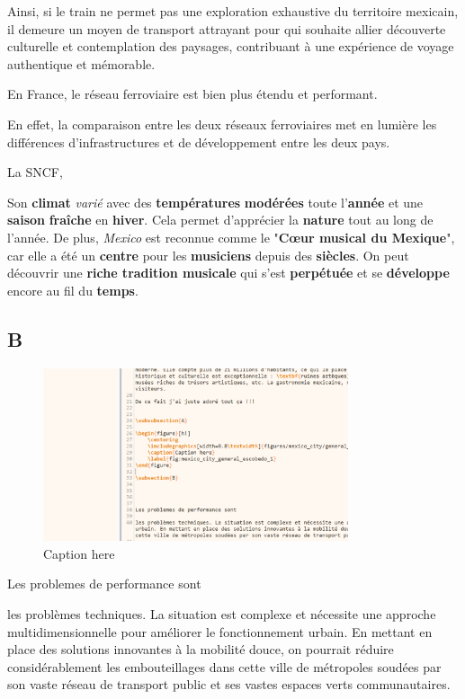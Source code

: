 \documentclass[12pt, a4paper]{article}
\begin{document}
Ainsi, si le train ne permet pas une exploration exhaustive du territoire mexicain, il demeure un moyen de transport attrayant pour qui souhaite allier découverte culturelle et contemplation des paysages, contribuant à une expérience de voyage authentique et mémorable.

En France, le réseau ferroviaire est bien plus étendu et performant.

En effet, la comparaison entre les deux réseaux ferroviaires met en lumière les différences d'infrastructures et de développement entre les deux pays.

La SNCF, 

Son \textbf{climat} \textit{varié} avec des \textbf{températures} \textbf{modérées} toute l’\textbf{année} et une \textbf{saison} \textbf{fraîche} en \textbf{hiver}. Cela permet d’apprécier la \textbf{nature} tout au long de l’année. De plus, \textit{Mexico} est reconnue comme le "\textbf{Cœur musical du Mexique}", car elle a été un \textbf{centre} pour les \textbf{musiciens} depuis des \textbf{siècles}. On peut découvrir une \textbf{riche tradition musicale} qui s’est \textbf{perpétuée} et se \textbf{développe} encore au fil du \textbf{temps}.



\subsection{B}


\begin{figure}[h!]
    \centering
    \includegraphics[width=0.8\textwidth]{figures/mexico_city/b/default/fig_1.png}
    \caption{Caption here}
    \label{fig:mexico_city_b_1}
\end{figure}





Les problemes de performance sont 

les problèmes techniques. La situation est complexe et nécessite une approche multidimensionnelle pour améliorer le fonctionnement urbain. En mettant en place des solutions innovantes à la mobilité douce, on pourrait réduire considérablement les embouteillages dans cette ville de métropoles soudées par son vaste réseau de transport public et ses vastes espaces verts communautaires.
\end{document}
